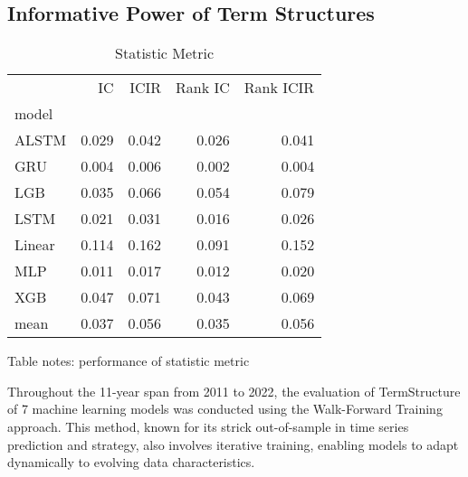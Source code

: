 \documentclass[10pt,letterpaper]{article}
\begin{document}
\subsection*{Informative Power of Term Structures}



\begin{table}[!ht]
\centering
\caption{Statistic Metric}
\label{Statistic Metric}
\begin{tabular}{lrrrr}
\toprule
{} &     IC &   ICIR &  Rank IC &  Rank ICIR \\
model  &        &        &          &            \\
\midrule
ALSTM  &  0.029 &  0.042 &    0.026 &      0.041 \\
GRU    &  0.004 &  0.006 &    0.002 &      0.004 \\
LGB    &  0.035 &  0.066 &    0.054 &      0.079 \\
LSTM   &  0.021 &  0.031 &    0.016 &      0.026 \\
Linear &  0.114 &  0.162 &    0.091 &      0.152 \\
MLP    &  0.011 &  0.017 &    0.012 &      0.020 \\
XGB    &  0.047 &  0.071 &    0.043 &      0.069 \\
mean   &  0.037 &  0.056 &    0.035 &      0.056 \\
\bottomrule
\end{tabular}




\begin{flushleft}
Table notes: performance of statistic metric
\end{flushleft}
\label{table1}

\end{table}

Throughout the 11-year span from 2011 to 2022, the evaluation of TermStructure of 7 machine learning models was conducted using the Walk-Forward Training approach. This method, known for its strick out-of-sample in time series prediction and strategy, also involves iterative training, enabling models to adapt dynamically to evolving data characteristics.
\end{document}
